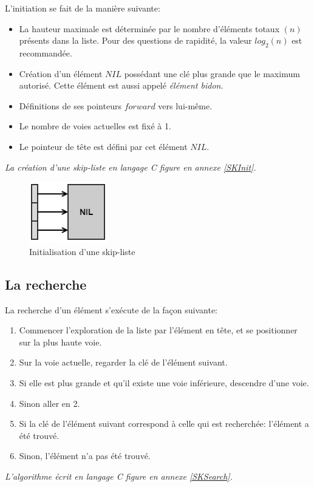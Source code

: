 \documentclass[hidelinks,a4paper, 12pt]{article}
\begin{document}
	L'initiation se fait de la manière suivante:
	\begin{itemize}
		\item La hauteur maximale est déterminée par le nombre d'éléments totaux $(n)$ présents dans la liste. Pour des questions de rapidité, la valeur $log_2(n)$ est recommandée.
		\item Création d'un élément $NIL$ possédant une clé plus grande que le maximum autorisé. Cette élément est aussi appelé \textit{élément bidon}.
		\item Définitions de ses pointeurs $forward$ vers lui-même.
		\item Le nombre de voies actuelles est fixé à 1.
		\item Le pointeur de tête est défini par cet élément $NIL$.
	\end{itemize}
	\emph{La création d'une skip-liste en langage C figure en annexe \ref{SKInit}.}
	
	\begin{figure}[h]
		\includegraphics{img/init}
		\caption{Initialisation d'une skip-liste}
		\label{SkipInit}
	\end{figure}
	
	\newpage
	\subsection{La recherche}
	La recherche d'un élément s'exécute de la façon suivante:
	\begin{enumerate}
		\item Commencer l'exploration de la liste par l'élément en tête, et se positionner sur la plus haute voie.
		\item Sur la voie actuelle, regarder la clé de l'élément suivant.
		\item Si elle est plus grande et qu'il existe une voie inférieure, descendre d'une voie.
		\item Sinon aller en 2.
		\item Si la clé de l'élément suivant correspond à celle qui est recherchée: l'élément a été trouvé.
		\item Sinon, l'élément n'a pas été trouvé.
	\end{enumerate}
	\emph{L'algorithme écrit en langage C figure en annexe \ref{SKSearch}.}
	
\end{document}
